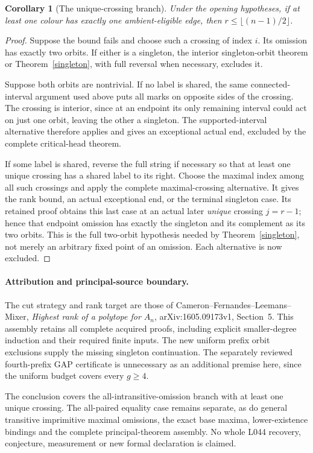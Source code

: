 \documentclass[11pt,a4paper]{article}
\newtheorem{corollary}[theorem]{Corollary}
\begin{document}
\begin{corollary}[The unique-crossing branch]\label{unique}
Under the opening hypotheses, if at least one colour has exactly
one ambient-eligible edge, then
$r\le\lfloor(n-1)/2\rfloor$.
\end{corollary}
\begin{proof}
Suppose the bound fails and choose such a crossing of index $i$.
Its omission has exactly two orbits. If either is a singleton,
the interior singleton-orbit theorem or Theorem~\ref{singleton},
with full reversal when necessary, excludes it.

Suppose both orbits are nontrivial. If no label is shared, the
same connected-interval argument used above puts all marks on
opposite sides of the crossing. The crossing is interior, since
at an endpoint its only remaining interval could act on just
one orbit, leaving the other a singleton. The supported-interval
alternative therefore applies and gives an exceptional actual
end, excluded by the complete critical-head theorem.

If some label is shared, reverse the full string if necessary
so that at least one unique crossing has a shared label to its
right. Choose the maximal index among all such crossings and
apply the complete maximal-crossing alternative. It gives the
rank bound, an actual exceptional end, or the terminal singleton
case. Its retained proof obtains this last case at an actual
later \emph{unique} crossing $j=r-1$; hence that endpoint omission
has exactly the singleton and its complement as its two orbits.
This is the full two-orbit hypothesis needed by
Theorem~\ref{singleton}, not merely an arbitrary fixed point of
an omission. Each alternative is now excluded.
\end{proof}

\paragraph{Attribution and principal-source boundary.}
The cut strategy and rank target are those of
Cameron--Fernandes--Leemans--Mixer, \emph{Highest rank of a polytope
for $A_n$}, arXiv:1605.09173v1, Section~5. This assembly retains
all complete acquired proofs, including explicit smaller-degree
induction and their required finite inputs. The new uniform prefix
orbit exclusions supply the missing singleton continuation. The
separately reviewed fourth-prefix GAP certificate is unnecessary
as an additional premise here, since the uniform budget covers
every $g\ge4$.

The conclusion covers the all-intransitive-omission branch with
at least one unique crossing. The all-paired equality case remains
separate, as do general transitive imprimitive maximal omissions,
the exact base maxima, lower-existence bindings and the complete
principal-theorem assembly. No whole L044 recovery, conjecture,
measurement or new formal declaration is claimed.
\end{document}
